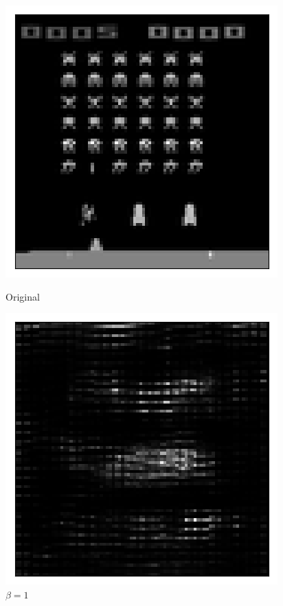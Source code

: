 \begin{figure}[h!]
\centering
\captionsetup{justification=centering}
\begin{multicols}{4}
    \includegraphics[scale=0.4]{figures/results/latent_image/beta_1_posterior_sample_original.png}
    \caption{Original}
    \includegraphics[scale=0.4]{figures/results/latent_image/beta_1_posterior_sample_0.png}
    \caption{$\beta=1$}

\end{multicols}
\end{figure}
